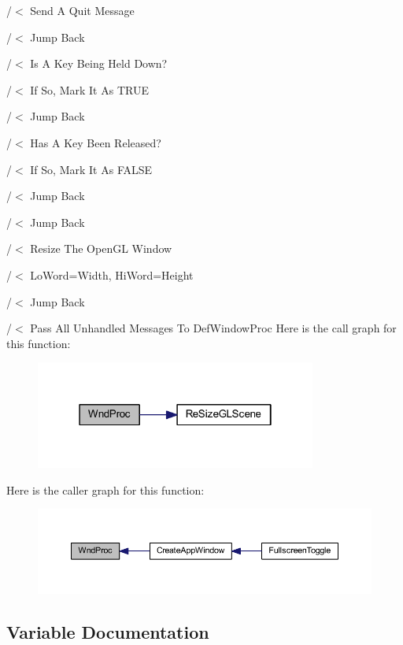 /$<$ Send A Quit Message

/$<$ Jump Back

/$<$ Is A Key Being Held Down?

/$<$ If So, Mark It As T\+R\+UE

/$<$ Jump Back

/$<$ Has A Key Been Released?

/$<$ If So, Mark It As F\+A\+L\+SE

/$<$ Jump Back

/$<$ Jump Back

/$<$ Resize The Open\+GL Window

/$<$ Lo\+Word=Width, Hi\+Word=Height

/$<$ Jump Back

/$<$ Pass All Unhandled Messages To Def\+Window\+Proc Here is the call graph for this function\+:\nopagebreak
\begin{figure}[H]
\begin{center}
\leavevmode
\includegraphics[width=262pt]{supportcode_8h_a9135ea2a0d6fce68ba3b858226a31a4f_cgraph}
\end{center}
\end{figure}
Here is the caller graph for this function\+:\nopagebreak
\begin{figure}[H]
\begin{center}
\leavevmode
\includegraphics[width=350pt]{supportcode_8h_a9135ea2a0d6fce68ba3b858226a31a4f_icgraph}
\end{center}
\end{figure}


\subsection{Variable Documentation}
\mbox{\label{supportcode_8h_a6d31dc000e2efbdae8825a7ff0d542c1}} 
